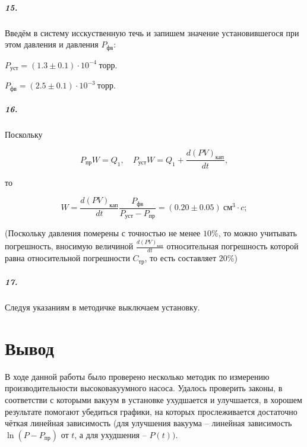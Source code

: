\documentclass[a4paper,12pt]{article}
\begin{document}
\subparagraph*{15.} Введём в систему исскуственную течь и запишем значение  установившегося при этом давления и давления $P_{фв}$: 


$
P_{уст} = (1.3 \pm 0.1) \cdot 10^{-4} ~ торр.
$

$
P_{фв} = (2.5 \pm 0.1) \cdot 10^{-3} ~ торр.
$


\subparagraph*{16.} Поскольку

$$
P_{пр} W = Q_1, \quad P_{уст} W = Q_1 + \frac{d(PV)_{кап}}{dt}, 
$$

то 

$$
W = \frac{d(PV)_{кап}}{dt}\frac{P_{фв}}{P_{ уст}-P_{пр}} = (0.20 \pm 0.05) ~см^3 \cdot c;
$$


(Поскольку давления померены с точностью не менее $10\%$, то можно учитывать погрешность, вносимую величиной $\frac{d(PV)_{кап}}{dt}$ относительная погрешность которой равна относительной погрешности $C_{тр}$, то есть составляет $20\%$)


\subparagraph*{17.} Следуя указаниям в методичке выключаем установку. 


\section*{Вывод}

В ходе данной работы было проверено несколько методик по измерению производительности высоковакуумного насоса. Удалось проверить законы, в соответстви с которыми вакуум в установке ухудшается и улучшается, в хорошем результате помогают убедиться графики, на которых прослеживается достаточно чёткая линейная зависимость (для улучшения вакуума -- линейная зависимость $\ln (P-P_{пр})$ от $t$, а для ухудшения -- $P(t))$.  
\end{document}
